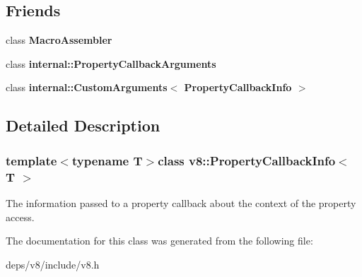 \subsection*{Friends}
\begin{DoxyCompactItemize}
\item 
\hypertarget{classv8_1_1_property_callback_info_ae605ff1d9d93250ace8a0a8b8d1dee67}{}class {\bfseries Macro\+Assembler}\label{classv8_1_1_property_callback_info_ae605ff1d9d93250ace8a0a8b8d1dee67}

\item 
\hypertarget{classv8_1_1_property_callback_info_a1ba96a1268a72c23f50314cd99c76f1b}{}class {\bfseries internal\+::\+Property\+Callback\+Arguments}\label{classv8_1_1_property_callback_info_a1ba96a1268a72c23f50314cd99c76f1b}

\item 
\hypertarget{classv8_1_1_property_callback_info_ad1d1e15ddaed2ab44e8f21c5564881ba}{}class {\bfseries internal\+::\+Custom\+Arguments$<$ Property\+Callback\+Info $>$}\label{classv8_1_1_property_callback_info_ad1d1e15ddaed2ab44e8f21c5564881ba}

\end{DoxyCompactItemize}


\subsection{Detailed Description}
\subsubsection*{template$<$typename T$>$class v8\+::\+Property\+Callback\+Info$<$ T $>$}

The information passed to a property callback about the context of the property access. 

The documentation for this class was generated from the following file\+:\begin{DoxyCompactItemize}
\item 
deps/v8/include/v8.\+h\end{DoxyCompactItemize}
